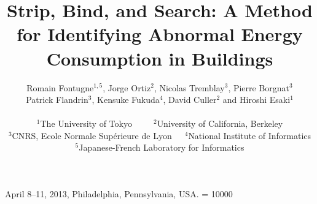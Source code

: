 \documentclass{sig-alternate}
\title{Strip, Bind, and Search: A Method for Identifying Abnormal Energy Consumption in Buildings}
\author{
Romain Fontugne{\large$^{1,5}$}, Jorge Ortiz{\large$^2$}, Nicolas Tremblay{\large$^3$}, Pierre Borgnat{\large$^3$}
\\
Patrick Flandrin{\large$^3$}, Kensuke Fukuda{\large$^4$}, David Culler{\large$^2$} and Hiroshi Esaki{\large$^1$}
\\~\\
{\large$^1$}The University of Tokyo~~~~~{\large$^2$}University of California, Berkeley\\
{\large$^3$}CNRS, Ecole Normale Sup\'erieure de Lyon~~~{\large$^4$}National Institute of Informatics\\
{\large$^5$}Japanese-French Laboratory for Informatics
}
\begin{document}
 {April 8--11, 2013, Philadelphia, Pennsylvania, USA.} 
\widowpenalty = 10000


\maketitle



















\small


\end{document}
